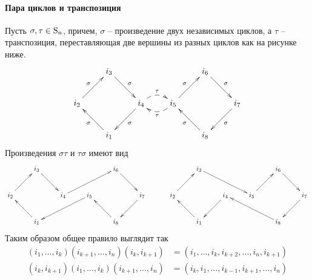 \paragraph{Пара циклов и транспозиция} Пусть $\sigma,\tau\in\operatorname{S}_{n}$, причем, $\sigma$ -- произведение двух независимых циклов, а $\tau$ -- транспозиция, переставляющая две вершины из разных циклов как на рисунке ниже.
\[
\xymatrix{
{}&{i_3}\ar[dr]^{\sigma}&{}&{}&{i_6}\ar[dr]^{\sigma}&{}\\
{i_2}\ar[ur]^{\sigma}&{}&{i_4}\ar[dl]^{\sigma}\ar@{-->}@/^10pt/[r]^{\tau}&{i_5}\ar[ur]^{\sigma}\ar@{-->}@/^10pt/[l]^{\tau}&{}&{i_7}\ar[dl]^{\sigma}\\
{}&{i_1}\ar[ul]^{\sigma}&{}&{}&{i_8}\ar[ul]^{\sigma}&{}\\
}
\]
Произведения $\sigma\tau$ и $\tau\sigma$ имеют вид
\[
\xymatrix{
	{}&{i_3}\ar[dr]&{}&{}&{i_6}\ar[dr]&{}\\
	{i_2}\ar[ur]&{}&{i_4}\ar[urr]&{i_5}\ar[dll]&{}&{i_7}\ar[dl]\\
	{}&{i_1}\ar[ul]&{}&{}&{i_8}\ar[ul]&{}\\
}
\quad\quad\quad
\xymatrix{
	{}&{i_3}\ar[drr]&{}&{}&{i_6}\ar[dr]&{}\\
	{i_2}\ar[ur]&{}&{i_4}\ar[dl]&{i_5}\ar[ur]&{}&{i_7}\ar[dl]\\
	{}&{i_1}\ar[ul]&{}&{}&{i_8}\ar[ull]&{}\\
}
\]
Таким образом общее правило выглядит так
\begin{align*}
(i_1,\ldots,i_k)(i_{k+1},\ldots,i_n)(i_k,i_{k+1}) &=(i_1,\ldots,i_k,i_{k+2},\ldots,i_n,i_{k+1})\\
(i_k,i_{k+1})(i_1,\ldots,i_k)(i_{k+1},\ldots,i_n) &= (i_k,i_1,\ldots,i_{k-1},i_{k+1},\ldots,i_n)
\end{align*}

